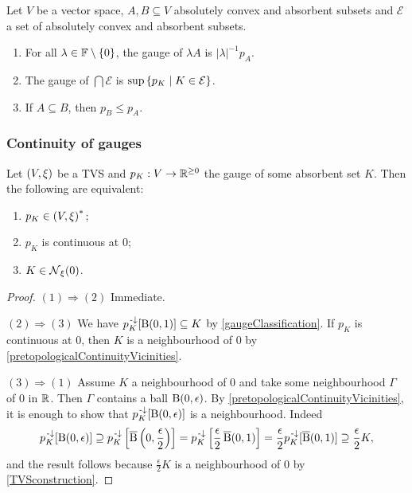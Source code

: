 \begin{proposition} \label{gaugeConstructions}
Let $V$ be a vector space, $A,B\subseteq V$ absolutely convex and absorbent subsets and $\mathcal{E}$ a set of absolutely convex and absorbent subsets.
\begin{enumerate}
\item For all $\lambda\in \mathbb{F}\setminus\{0\}$, the gauge of $\lambda A$ is $|\lambda|^{-1}p_A$.
\item The gauge of $\bigcap \mathcal{E}$ is $\sup\left\{ p_K \;\middle|\; K\in \mathcal{E} \right\}$.
\item If $A\subseteq B$, then $p_B \leq p_A$.
\end{enumerate}
\end{proposition}

\subsubsection{Continuity of gauges}
\begin{proposition} \label{seminormContinuity}
Let $\left( V,\xi \right)$ be a TVS and $p_K:V\to \mathbb{R}^{\geq 0}$ the gauge of some absorbent set $K$. Then the following are equivalent:
\begin{enumerate}
\item $p_K\in \left( V,\xi \right)^*$;
\item $p_K$ is continuous at $0$;
\item $K\in \operatorname{\mathcal{N}}_\xi(0)$.
\end{enumerate}
\end{proposition}
\begin{proof}
$(1) \Rightarrow (2)$ Immediate.

$(2) \Rightarrow (3)$ We have $p_K^{{\text{\hspace{0.15em}-}\downarrow}}[\operatorname{B}(0,1)] \subseteq K$ by \ref{gaugeClassification}. If $p_K$ is continuous at $0$, then $K$ is a neighbourhood of $0$ by \ref{pretopologicalContinuityVicinities}.

$(3) \Rightarrow (1)$ Assume $K$ a neighbourhood of $0$ and take some neighbourhood $\Gamma$ of $0$ in $\mathbb{R}$. Then $\Gamma$ contains a ball $\operatorname{B}(0,\epsilon)$. By \ref{pretopologicalContinuityVicinities}, it is enough to show that $p_K^{{\text{\hspace{0.15em}-}\downarrow}}[\operatorname{B}(0,\epsilon)]$ is a neighbourhood. Indeed
\[ p_K^{{\text{\hspace{0.15em}-}\downarrow}}[\operatorname{B}(0,\epsilon)] \supseteq p_K^{{\text{\hspace{0.15em}-}\downarrow}}\left[\operatorname{\overline{B}}\left(0,\frac{\epsilon}{2}\right)\right] = p_K^{{\text{\hspace{0.15em}-}\downarrow}}\left[\frac{\epsilon}{2}\operatorname{\overline{B}}(0,1)\right] = \frac{\epsilon}{2} p_K^{{\text{\hspace{0.15em}-}\downarrow}}[\operatorname{\overline{B}}(0,1)] \supseteq \frac{\epsilon}{2} K, \]
and the result follows because $\frac{\epsilon}{2}K$ is a neighbourhood of $0$ by \ref{TVSconstruction}.
\end{proof}

